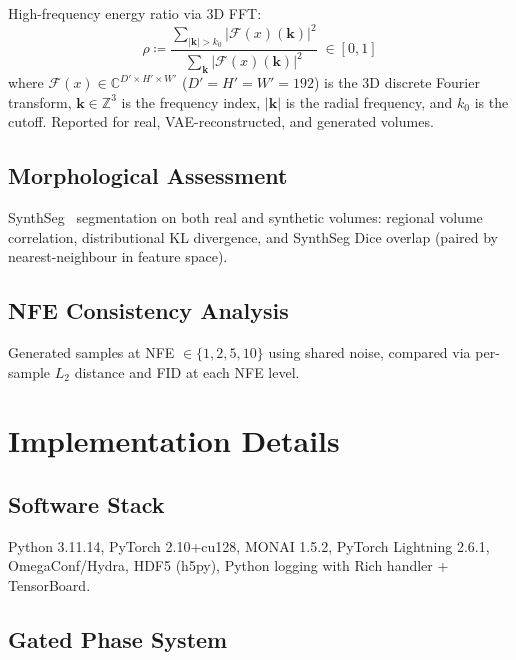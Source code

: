 \documentclass[11pt,a4paper]{article}
\begin{document}
High-frequency energy ratio via 3D FFT:
\begin{equation}
  \rho \coloneqq \frac{\displaystyle\sum_{|\mathbf{k}|>k_0} |\mathcal{F}(x)(\mathbf{k})|^2}
              {\displaystyle\sum_{\mathbf{k}} |\mathcal{F}(x)(\mathbf{k})|^2}
    \;\in [0,1]
  \label{eq:spectral}
\end{equation}
where $\mathcal{F}(x) \in \mathbb{C}^{D' \times H' \times W'}$ ($D'{=}H'{=}W'{=}192$)
is the 3D discrete Fourier transform, $\mathbf{k} \in \mathbb{Z}^3$ is the
frequency index, $|\mathbf{k}|$ is the radial frequency, and $k_0$ is the
cutoff.  Reported for real, VAE-reconstructed, and generated volumes.

\subsection{Morphological Assessment}

SynthSeg~\cite{synthseg} segmentation on both real and synthetic volumes:
regional volume correlation, distributional KL divergence, and SynthSeg Dice
overlap (paired by nearest-neighbour in feature space).

\subsection{NFE Consistency Analysis}

Generated samples at NFE $\in \{1,2,5,10\}$ using shared noise, compared via
per-sample $L_2$ distance and FID at each NFE level.


\section{Implementation Details}
\label{sec:implementation}

\subsection{Software Stack}

Python 3.11.14, PyTorch 2.10+cu128, MONAI 1.5.2, PyTorch Lightning 2.6.1,
OmegaConf/Hydra, HDF5 (h5py), Python logging with Rich handler + TensorBoard.

\subsection{Gated Phase System}
\end{document}
